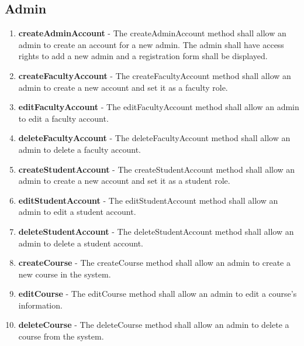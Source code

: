 \documentclass[letterpaper,12pt,oneside,listof=totoc]{scrreprt}
\begin{document}
\subsection{Admin}
\begin{enumerate}
    \item \textbf{createAdminAccount} - The createAdminAccount method shall allow an admin to create an account for a new admin. The admin shall have access rights to add a new admin and a registration form shall be displayed.
    \item \textbf{createFacultyAccount} - The createFacultyAccount method shall allow an admin to create a new account and set it as a faculty role.
    \item \textbf{editFacultyAccount} - The editFacultyAccount method shall allow an admin to edit a faculty account.
    \item \textbf{deleteFacultyAccount} - The deleteFacultyAccount method shall allow an admin to delete a faculty account.
    \item \textbf{createStudentAccount} - The createStudentAccount method shall allow an admin to create a new account and set it as a student role.
    \item \textbf{editStudentAccount} - The editStudentAccount method shall allow an admin to edit a student account.
    \item \textbf{deleteStudentAccount} - The deleteStudentAccount method shall allow an admin to delete a student account.
    \item \textbf{createCourse} - The createCourse method shall allow an admin to create a new course in the system.
    \item \textbf{editCourse} - The editCourse method shall allow an admin to edit a course's information.
    \item \textbf{deleteCourse} - The deleteCourse method shall allow an admin to delete a course from the system.
\end{enumerate}
\end{document}
